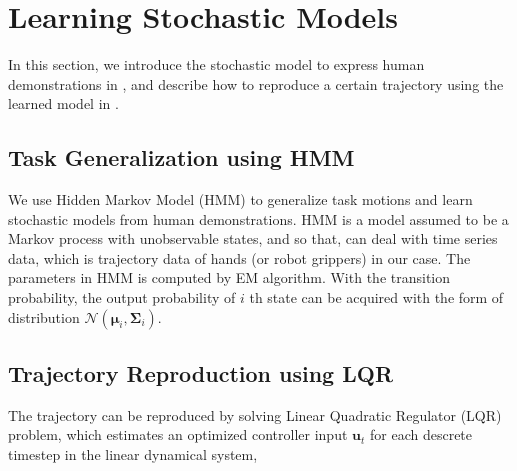 \def\muv{\bm{\mu}}
\def\uv{\bm{u}}
\def\A{\bm{A}}
\def\B{\bm{B}}
\def\Q{\bm{Q}}
\def\R{\bm{R}}
\def\S{\bm{S}}
\def\Sigmav{\bm{\Sigma}}
\def\zetav{\bm{\zeta}}

\section{Learning Stochastic Models}

In this section, we introduce the stochastic model to express human demonstrations in , and describe how to reproduce a certain trajectory using the learned model in .


\subsection{Task Generalization using HMM}
\label{section:encoding}
We use Hidden Markov Model (HMM) to generalize task motions and learn stochastic models from human demonstrations. HMM is a model assumed to be a Markov process with unobservable states, and so that, can deal with time series data, which is trajectory data of hands (or robot grippers) in our case. The parameters in HMM is computed by EM algorithm. With the transition probability, the output probability of \(i\) th state can be acquired with the form of distribution \( \mathcal{N}(\muv_i, \Sigmav_i) \).

\subsection{Trajectory Reproduction using LQR}
\label{section:decoding}
The trajectory can be reproduced by solving Linear Quadratic Regulator (LQR) problem, which estimates an optimized controller input \(\uv_t\) for each descrete timestep in the linear dynamical system,

